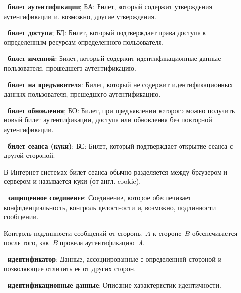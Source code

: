 {\bf \thedefctr~билет аутентификации}; БА:
Билет, который содержит утверждения аутентификации и, возможно, другие
утверждения.

{\bf \thedefctr~билет доступа}; БД:
Билет, который подтверждает права доступа к определенным ресурсам определенного 
пользователя.

{\bf \thedefctr~билет именной}:
Билет, который содержит идентификационные данные пользователя, прошедшего 
аутентификацию.

{\bf \thedefctr~билет на предъявителя}:
Билет, который не содержит идентификационных данных пользователя, прошедшего 
аутентификацию.

{\bf \thedefctr~билет обновления}; БО:
Билет, при предъявлении которого можно получить новый билет 
аутентификации, доступа или обновления без повторной аутентификации.


{\bf \thedefctr~билет сеанса (куки)}; БС:
Билет, который подтверждает открытие сеанса с другой стороной. 

\begin{note*}
В Интернет-системах билет сеанса обычно разделяется между браузером и 
сервером и называется куки (от англ. cookie).
\end{note*}

{\bf \thedefctr~защищенное соединение}: %
Соединение, которое обеспечивает конфиденциальность, 
контроль целостности и, возможно, подлинности сообщений. 

\begin{note*}
Контроль подлинности сообщений от стороны~$A$ к стороне~$B$ 
обеспечивается после того, как~$B$ провела аутентификацию~$A$.
\end{note*}

{\bf \thedefctr~идентификатор}:
Данные, ассоциированные с определенной стороной и позволяющие 
отличить ее от других сторон.





{\bf \thedefctr~идентификационные данные}:
Описание характеристик идентичности. 

